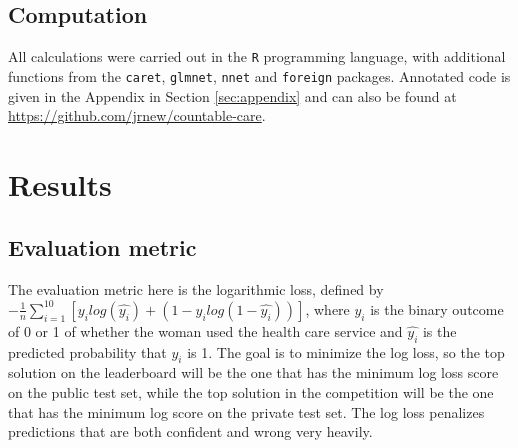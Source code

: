 \documentclass{article}\usepackage[]{graphicx}\usepackage[]{color}
\begin{document}
                                                                                                                                                                                                                                                                                                                                                                                                                                                                                                                                                                                                \subsection{Computation}
All calculations were carried out in the \texttt{R} programming language, with additional functions from the \texttt{caret}, \texttt{glmnet}, \texttt{nnet} and \texttt{foreign} packages. Annotated code is given in the Appendix in Section \ref{sec:appendix} and can also be found at \href{https://github.com/jrnew/countable-care}{https://github.com/jrnew/countable-care}.
\section{Results} 
\label{sec:results}

\subsection{Evaluation metric}
The evaluation metric here is the logarithmic loss, defined by $-\frac{1}{n}\sum_{i=1}^{10} [y_i log(\hat{y_i}) + (1-y_i log(1-\hat{y_i}))]$, where $y_i$ is the binary outcome of 0 or 1 of whether the woman used the health care service and $\hat{y_i}$ is the predicted probability that $y_i$ is 1. The goal is to minimize the log loss, so the top solution on the leaderboard will be the one that has the minimum log loss score on the public test set, while the top solution in the competition will be the one that has the minimum log score on the private test set. The log loss penalizes predictions that are both confident and wrong very heavily.
\end{document}
